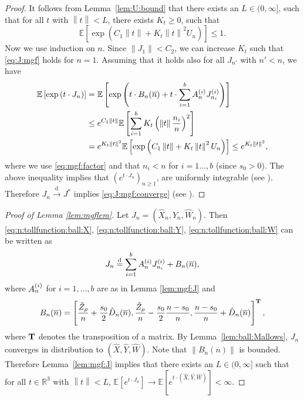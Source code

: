 \documentclass[11pt]{article}
\newcommand{\E}[1]{\mathbb{E} \left[#1\right]}
\newcommand{\norm}[1]{\left\lVert#1\right\rVert}
\newcommand{\ball}[1]{\hat{#1}}
\def\bX{\ball{X}}
\def\bY{\ball{Y}}
\def\bW{\ball{W}}
\newcommand{\bVec}{(\bX, \bY, \bW)}
\newcommand{\bVecN}{(\bX_n, \bY_n, \bW_n)}
\def\bZ{\ball{Z}}
\def\R{\mathbb{R}}
\numberwithin{theorem}{section}
\theoremstyle{definition}
\newcommand{\inlaw}{\dto}%
\newcommand{\eql}{\eqdd}%
\newcommand{\nBar}{\overline{n}}
\newcommand{\Toll}{D}
\newcommand{\bToll}{\ball{\Toll}}
\newcommand{\bTollN}{\bToll_{n}}
\numberwithin{equation}{section}
\newcommand{\refL}[1]{Lemma~\ref{#1}}
\newcommand{\too}{\longrightarrow}
\newcommand\dto{\overset{\mathrm{d}}{\too}}
\newcommand\eqdd{\overset{\mathrm{d}}{=}}
\begin{document}
\begin{proof}
It follows from \refL{lem:U:bound} that there exists an \(L \in (0, \infty]\), such that
for all \(t\) with \(\norm{t} < L\), there exists \(K_{t} \ge 0\), such that
\begin{equation}
    \E{\exp\left(C_{1} \norm{t} + K_{t} \norm{t}^{2} U_{n}\right)}
    \le 1
    .
    \label{eq:mgf:factor}
\end{equation}
Now we use induction on \(n\).
Since \(\norm{J_1} < C_2\), we can increase \(K_t\) such that \eqref{eq:J:mgf} holds for \(n=1\).
Assuming that it holds also for all \(J_{n'}\) with \(n' < n\), we have
\begin{align}
    \E{\exp\left( t \cdot J_n \right)}
    &
    =
    \E{\exp\left( t \cdot B_{n}(\nBar) + t \cdot \sum_{i=1}^b \Ain \Jini \right)}
    \\
    &
    \le
    e^{C_{1} \norm{t}} \E{\sum_{i=1}^{b} K_{t} \left(\norm{t} \frac{n_{i}}{n}  \right)^{2} }
    \\
    &
    =
    e^{K_{t} \norm{t}^{2}}
    \E{\exp\left({C_{1} \norm{t} + K_{t} \norm{t}^{2} U_{n}}\right)}
    \le
    e^{K_{t} \norm{t}^{2}},
    \label{eq:bX:mgf1}
\end{align}
where we use \eqref{eq:mgf:factor} and that \(n_{i} < n\) for \(i=1\dots,b\) (since \(s_0 > 0\)).
The above inequality implies that
\( (e^{t \cdot J_{n}})_{n\ge1} \), are 
uniformly integrable (see \cite[Theorem\
5.4.2]{g13}).  
Therefore 
\(J_{n} \inlaw J^{*}\) implies \eqref{eq:J:mgf:converge}
(see \cite[Theorem\ 5.5.2]{d10}).
\end{proof}

\begin{proof}[Proof of Lemma \ref{lem:mgflem}]
    Let \(J_{n} = \bVecN\). Then \eqref{eq:n:tollfunction:ball:X}, \eqref{eq:n:tollfunction:ball:Y},
    \eqref{eq:n:tollfunction:ball:W} can be written as
    \begin{equation}
        J_{n} \eql \sum_{i=1}^{b} \Ain \Jini + B_{n}(\nBar),
    \end{equation}
    where \(A_{n}^{(i)}\) for \(i =1,\dots,b\) are as in Lemma \ref{lem:mgf:J} and 
    \begin{equation}
        B_{n}(\nBar) = 
        \left[
            \frac{\bZ_{\rho}}{n} + \frac{s_0}{2} \bTollN(\nBar),
            \frac{\bZ_{\rho}}{n} - \frac{s_0}{2} \frac{n-s_0}{n},
            \frac{n-s_0}{n} + \bTollN(\nBar)
        \right]^{\bf T}
        ,
        \label{eq:B}
    \end{equation}
    where \({\bf T}\) denotes the transposition of a matrix.
    By \refL{lem:ball:Mallows}, 
    \( J_{n}\) converges in distribution to
    \(\bVec\).
    Note that \(\norm{B_{n}(\nBar)}\) is bounded.
    Therefore \refL{lem:mgf:J} implies that there exists an \(L \in (0,\infty]\) such
    that for all \(t \in \R^{3}\) with \( \norm{t} < L\), 
\(\E{e^{t \cdot J_{n}}} \to \E{e^{t \cdot \bVec}}<\infty\).
\end{proof}
\end{document}
